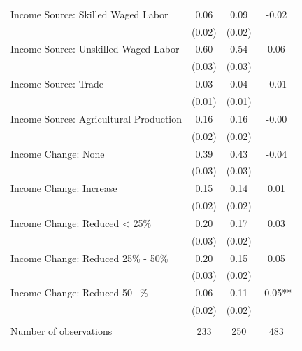 \begin{tabular}{@{\extracolsep{5pt}}lccc}
Income Source: Skilled Waged Labor   & 0.06    & 0.09    & -0.02   \\
 & (0.02)  & (0.02)  &  \\ [1ex]
Income Source: Unskilled Waged Labor   & 0.60    & 0.54    & 0.06   \\
 & (0.03)  & (0.03)  &  \\ [1ex]
Income Source: Trade   & 0.03    & 0.04    & -0.01   \\
 & (0.01)  & (0.01)  &  \\ [1ex]
Income Source: Agricultural Production   & 0.16    & 0.16    & -0.00   \\
 & (0.02)  & (0.02)  &  \\ [1ex]
Income Change: None   & 0.39    & 0.43    & -0.04   \\
 & (0.03)  & (0.03)  &  \\ [1ex]
Income Change: Increase   & 0.15    & 0.14    & 0.01   \\
 & (0.02)  & (0.02)  &  \\ [1ex]
Income Change: Reduced < 25\%   & 0.20    & 0.17    & 0.03   \\
 & (0.03)  & (0.02)  &  \\ [1ex]
Income Change: Reduced 25\% - 50\%   & 0.20    & 0.15    & 0.05   \\
 & (0.03)  & (0.02)  &  \\ [1ex]
Income Change: Reduced 50+\%   & 0.06    & 0.11    & -0.05**   \\
 & (0.02)  & (0.02)  &  \\ [1ex]
\hline \\[-1.8ex]
Number of observations  & 233   & 250  & 483  \\
\hline \hline \\[-1.8ex]

\end{tabular}
